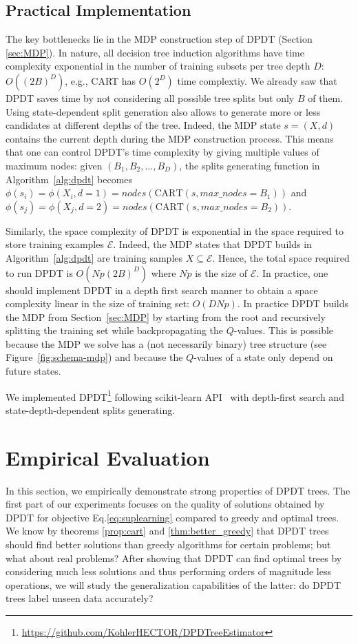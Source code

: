 \subsection{Practical Implementation}

The key bottlenecks lie in the MDP construction step of DPDT (Section \ref{sec:MDP}). In nature, all decision tree induction algorithms have time complexity exponential in the number of training subsets per tree depth $D$: $O((2B)^D)$, e.g., CART has $O(2^D)$ time complextiy. We already saw that DPDT saves time by not considering all possible tree splits but only $B$ of them. Using state-dependent split generation also allows to generate more or less candidates at different depths of the tree. Indeed, the MDP state $s = (X,d)$ contains the current depth during the MDP construction process. This means that one can control DPDT's time complexity by giving multiple values of maximum nodes: given $(B_1, B_2, ..., B_D)$, the splits generating function in Algorithm~\ref{alg:dpdt} becomes $\phi(s_i) = \phi(X_i, d=1) = nodes(\text{CART}(s, max\_nodes=B_1))$ and  $\phi(s_j) = \phi(X_j, d=2) = nodes(\text{CART}(s, max\_nodes=B_2))$.

Similarly, the space complexity of DPDT is exponential in the space required to store training examples $\mathcal E$. Indeed, the MDP states that DPDT builds in Algorithm~\ref{alg:dpdt} are training samples $X\subseteq \mathcal E$. Hence, the total space required to run DPDT is $O({Np}(2B)^{D})$ where $Np$ is the size of $\mathcal{E}$. In practice, one should implement DPDT in a depth first search manner to obtain a space complexity linear in the size of training set: $O(DNp)$. In practice DPDT builds the MDP from Section~\ref{sec:MDP} by starting from the root and recursively splitting the training set while backpropagating the $Q$-values. This is possible because the MDP we solve has a (not necessarily binary) tree structure (see Figure~\ref{fig:schema-mdp}) and because the $Q$-values of a state only depend on future states. 

We implemented DPDT\footnote{\url{https://github.com/KohlerHECTOR/DPDTreeEstimator}} following scikit-learn API~\cite{sklearn_api} with depth-first search and state-depth-dependent splits generating. 

\section{Empirical Evaluation}

In this section, we empirically demonstrate strong properties of DPDT trees. 
The first part of our experiments focuses on the quality of solutions obtained by DPDT for objective Eq.\ref{eq:suplearning} compared to greedy and optimal trees. We know by theorems \ref{prop:cart} and \ref{thm:better_greedy} that DPDT trees should find better solutions than greedy algorithms for certain problems; but what about real problems?
After showing that DPDT can find optimal trees by considering much less solutions and thus performing orders of magnitude less operations, we will study the generalization capabilities of the latter: do DPDT trees label unseen data accurately?

